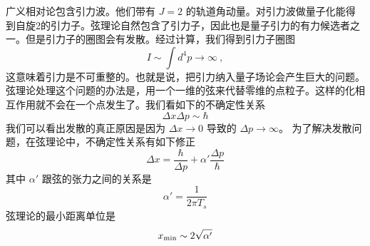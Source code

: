 
\begin{issues}
\issueNeedCite
\issueMissDepend
\end{issues}
 
 广义相对论包含引力波。他们带有 $J = 2$ 的轨道角动量。对引力波做量子化能得到自旋2的引力子。弦理论自然包含了引力子，因此也是量子引力的有力候选者之一。但是引力子的圈图会有发散。经过计算，我们得到引力子圈图
\begin{equation}
I \sim \int d^4 p \rightarrow \infty ~,
\end{equation}
这意味着引力是不可重整的。也就是说，把引力纳入量子场论会产生巨大的问题。弦理论处理这个问题的办法是，用一个一维的弦来代替零维的点粒子。这样的化相互作用就不会在一个点发生了。我们看如下的不确定性关系
\begin{equation}
\Delta x \Delta p \sim \hbar  
\end{equation}
我们可以看出发散的真正原因是因为 $\Delta x \rightarrow 0$ 导致的 $\Delta p \rightarrow  \infty  $。  为了解决发散问题，在弦理论中，不确定性关系有如下修正
\begin{equation}
\Delta x  = \frac{\hbar}{\Delta p} + \alpha' \frac{\Delta p}{\hbar }
\end{equation}
其中 $\alpha'$ 跟弦的张力之间的关系是
\begin{equation}
\alpha ' = \frac{1}{2 \pi T_s} 
\end{equation}
弦理论的最小距离单位是
\begin{equation}
x_{\rm min} \sim 2 \sqrt{\alpha'}
\end{equation}
